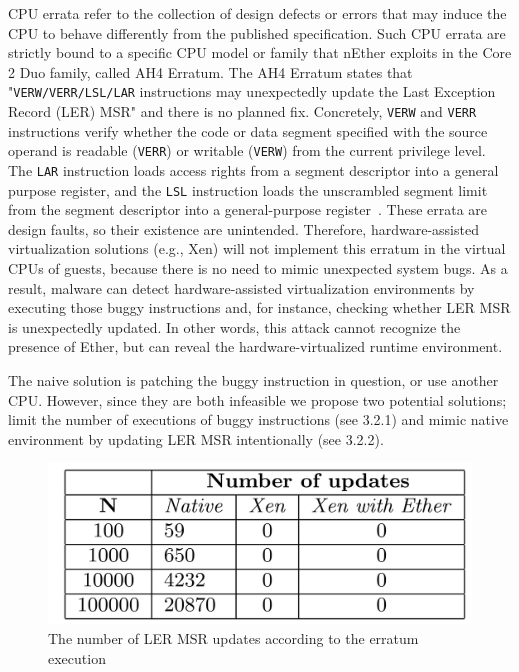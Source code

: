 CPU errata refer to the collection of design defects or errors that may induce
the CPU to behave differently from the published specification. Such CPU errata
are strictly bound to a specific CPU model or family that nEther exploits in the
Core 2 Duo family, called AH4 Erratum. The AH4 Erratum states that
"\texttt{VERW/VERR/LSL/LAR} instructions may unexpectedly update the Last
Exception Record (LER) MSR" and there is no planned fix. Concretely,
\texttt{VERW} and \texttt{VERR} instructions verify whether the code or data
segment specified with the source operand is readable (\texttt{VERR}) or
writable (\texttt{VERW}) from the current privilege level. The \texttt{LAR}
instruction loads access rights from a segment descriptor into a general purpose
register, and the \texttt{LSL} instruction loads the unscrambled segment limit
from the segment descriptor into a general-purpose register~\cite{intelsys}.
These errata are design faults, so their existence are unintended. Therefore,
hardware-assisted virtualization solutions (e.g., Xen) will not implement this
erratum in the virtual CPUs of guests, because there is no need to mimic
unexpected system bugs. As a result, malware can detect hardware-assisted
virtualization environments by executing those buggy instructions and, for
instance, checking whether LER MSR is unexpectedly updated. In other words, this
attack cannot recognize the presence of Ether, but can reveal the
hardware-virtualized runtime environment.

The naive solution is patching the buggy instruction in question, or use another
CPU. However, since they are both infeasible we propose two potential solutions;
limit the number of executions of buggy instructions (see 3.2.1) and mimic native environment by updating LER MSR intentionally (see 3.2.2).

\begin{figure}[!h]
	\centering
	\includegraphics[width=\linewidth]{figure/errata_table.png}
	\caption{The number of LER MSR updates according to the erratum execution}
	\label{fig:errata}
\end{figure}

